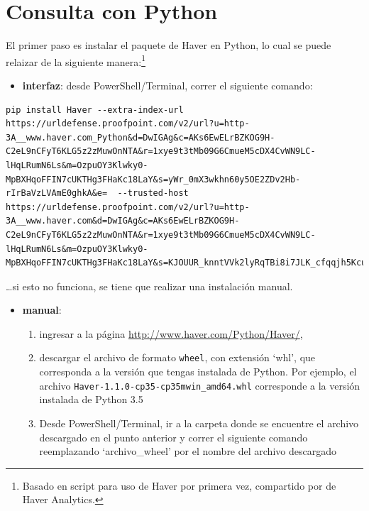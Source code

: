 \documentclass[
]{book}
\providecommand{\tightlist}{%
  \setlength{\itemsep}{0pt}\setlength{\parskip}{0pt}}
\begin{document}
\hypertarget{consulta-con-python}{%
\section{Consulta con Python}\label{consulta-con-python}}

El primer paso es instalar el paquete de Haver en Python, lo cual se puede relaizar de la siguiente manera:\footnote{Basado en script para uso de Haver por primera vez, compartido por \citet{haver_python_install} de Haver Analytics.}

\begin{itemize}
\tightlist
\item
  \textbf{interfaz}: desde PowerShell/Terminal, correr el siguiente comando:
\end{itemize}

\begin{verbatim}
pip install Haver --extra-index-url https://urldefense.proofpoint.com/v2/url?u=http-3A__www.haver.com_Python&d=DwIGAg&c=AKs6EwELrBZKOG9H-C2eL9nCFyT6KLG5z2zMuwOnNTA&r=1xye9t3tMb09G6CmueM5cDX4CvWN9LC-lHqLRumN6Ls&m=OzpuOY3Klwky0-MpBXHqoFFIN7cUKTHg3FHaKc18LaY&s=yWr_0mX3wkhn60y5OE2ZDv2Hb-rIrBaVzLVAmE0ghkA&e=  --trusted-host https://urldefense.proofpoint.com/v2/url?u=http-3A__www.haver.com&d=DwIGAg&c=AKs6EwELrBZKOG9H-C2eL9nCFyT6KLG5z2zMuwOnNTA&r=1xye9t3tMb09G6CmueM5cDX4CvWN9LC-lHqLRumN6Ls&m=OzpuOY3Klwky0-MpBXHqoFFIN7cUKTHg3FHaKc18LaY&s=KJOUUR_knntVVk2lyRqTBi8i7JLK_cfqqjh5Kcu1ReE&e=
\end{verbatim}

\ldots si esto no funciona, se tiene que realizar una instalación manual.

\begin{itemize}
\tightlist
\item
  \textbf{manual}:

  \begin{enumerate}
  \def\labelenumi{\arabic{enumi}.}
  \tightlist
  \item
    ingresar a la página \url{http://www.haver.com/Python/Haver/},
  \item
    descargar el archivo de formato \texttt{wheel}, con extensión `whl', que corresponda a la versión que tengas instalada de Python. Por ejemplo, el archivo \texttt{Haver-1.1.0-cp35-cp35mwin\_amd64.whl} corresponde a la versión instalada de Python 3.5
  \item
    Desde PowerShell/Terminal, ir a la carpeta donde se encuentre el archivo descargado en el punto anterior y correr el siguiente comando reemplazando `archivo\_wheel' por el nombre del archivo descargado
  \end{enumerate}
\end{itemize}
\end{document}
